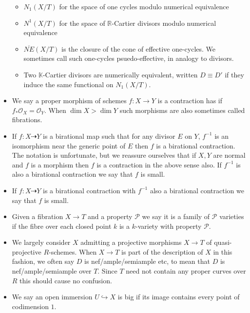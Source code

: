 \documentclass[a4paper,12pt]{book}
\newcommand{\ox}[1][X]{\mathcal{O}_{#1}}
\begin{document}
\begin{itemize}
\begin{itemize}
			\item $N_{1}(X/T)$ for the space of one cycles modulo numerical equivalence
			\item $N^{1}(X/T)$ for the space of $\mathbb{R}$-Cartier divisors modulo numerical equivalence
			\item $\overline{NE}(X/T)$ is the closure of the cone of effective one-cycles. We sometimes call such one-cycles psuedo-effective, in analogy to divisors.
			\item Two $\mathbb{K}$-Cartier divisors are numerically equivalent, written $D \equiv D'$ if they induce the same functional on $N_{1}(X/T)$.
		\end{itemize}
		\item We say a proper morphism of schemes $f\colon X \to Y$ is a contraction has if $f_{*}\ox=\ox[Y]$. When $\dim X > \dim Y$ such morphisms are also sometimes called fibrations.
		\item If $f \colon X \dashrightarrow Y$ is a birational map such that for any divisor $E$ on $Y$, $f^{-1}$ is an isomorphism near the generic point of $E$ then $f$ is a birational contraction. The notation is unfortunate, but we reassure ourselves that if $X,Y$ are normal and $f$ is a morphism then $f$ is a contraction in the above sense also. If $f^{-1}$ is also a birational contraction we say that $f$ is small. 
		\item If $f \colon X \dashrightarrow Y$ is a birational contraction with $f^{-1}$ also a birational contraction we say that $f$ is small.
		\item Given a fibration $X \to T$ and a property $\mathcal{P}$ we say it is a family of $\mathcal{P}$ varieties if the fibre over each closed point $k$ is a $k$-variety with property $\mathcal{P}$.
		\item We largely consider $X$ admitting a projective morphisms $X\to T$ of quasi-projective $R$-schemes. When $X \to T$ is part of the description of $X$ in this fashion, we often say $D$ is nef/ample/semiample etc, to mean that $D$ is nef/ample/semiample over $T$. Since $T$ need not contain any proper curves over $R$ this should cause no confusion.
		\item We say an open immersion  $U \hookrightarrow X$ is big if its image contains every point of codimension $1$.
		
		
		
	\end{itemize}
	
\end{document}
